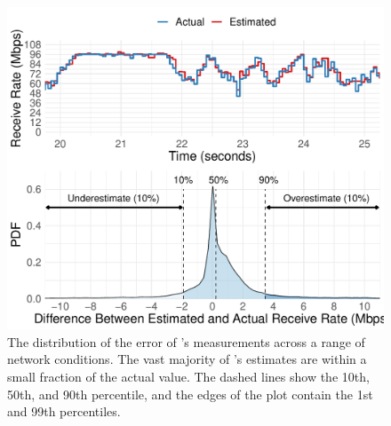 \begin{figure}
    \centering
\begin{knitrout}
\color{fgcolor}
\includegraphics[width=\maxwidth]{figure/micro:time-thru-1} 

\end{knitrout}

    \caption{The distribution of the error of \name's measurements across a range of network conditions. The vast majority of \name's estimates are within a small fraction of the actual value. The dashed lines show the 10th, 50th, and 90th percentile, and the edges of the plot contain the 1st and 99th percentiles.}
    \label{fig:micro:time-thru}
\end{figure}
